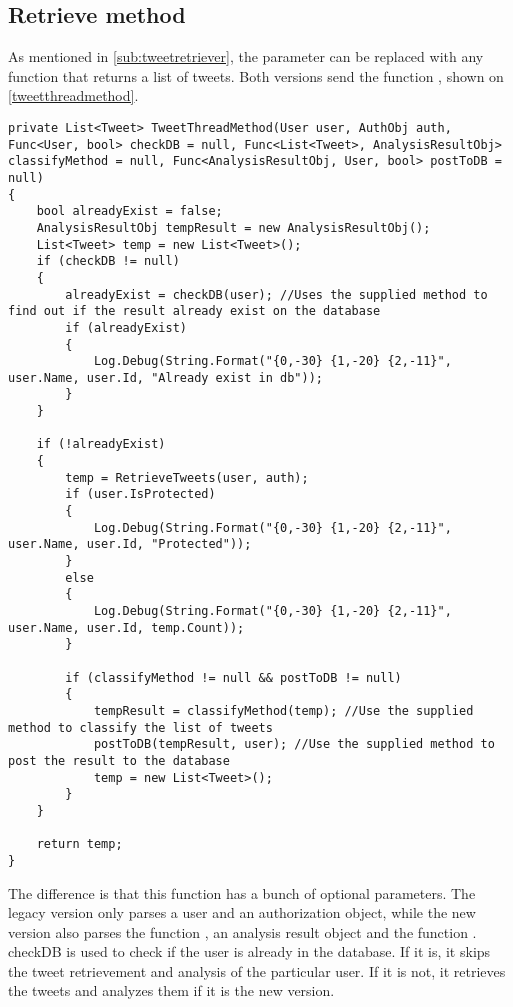 \subsection{Retrieve method}
As mentioned in \autoref{sub:tweetretriever}, the 
parameter can be replaced with any function that returns a list of tweets. Both
versions send the function , shown on
\autoref{tweetthreadmethod}. \\

\begin{minipage}[H]{\linewidth}
\begin{lstlisting}[caption = The TweetThreadMethod function, label =
tweetthreadmethod]
private List<Tweet> TweetThreadMethod(User user, AuthObj auth, Func<User, bool> checkDB = null, Func<List<Tweet>, AnalysisResultObj> classifyMethod = null, Func<AnalysisResultObj, User, bool> postToDB = null)
{
    bool alreadyExist = false;
    AnalysisResultObj tempResult = new AnalysisResultObj();
    List<Tweet> temp = new List<Tweet>();
    if (checkDB != null)
    {
        alreadyExist = checkDB(user); //Uses the supplied method to find out if the result already exist on the database
        if (alreadyExist)
        {
            Log.Debug(String.Format("{0,-30} {1,-20} {2,-11}", user.Name, user.Id, "Already exist in db"));
        }
    }

    if (!alreadyExist)
    {
        temp = RetrieveTweets(user, auth);
        if (user.IsProtected)
        {
            Log.Debug(String.Format("{0,-30} {1,-20} {2,-11}", user.Name, user.Id, "Protected"));
        }
        else
        {
            Log.Debug(String.Format("{0,-30} {1,-20} {2,-11}", user.Name, user.Id, temp.Count));
        }

        if (classifyMethod != null && postToDB != null)
        {
            tempResult = classifyMethod(temp); //Use the supplied method to classify the list of tweets
            postToDB(tempResult, user); //Use the supplied method to post the result to the database
            temp = new List<Tweet>();
        }
    }

    return temp;
}
\end{lstlisting}
\end{minipage}
The difference is that this function has a bunch of optional parameters. The legacy version only parses
a user and an authorization object, while the new version also parses the
function , an analysis result object and the function
. checkDB is used to check if the user is already in the
database. If it is, it skips the tweet retrievement and analysis of the
particular user. If it is not, it retrieves the tweets and analyzes them if it
is the new version.

